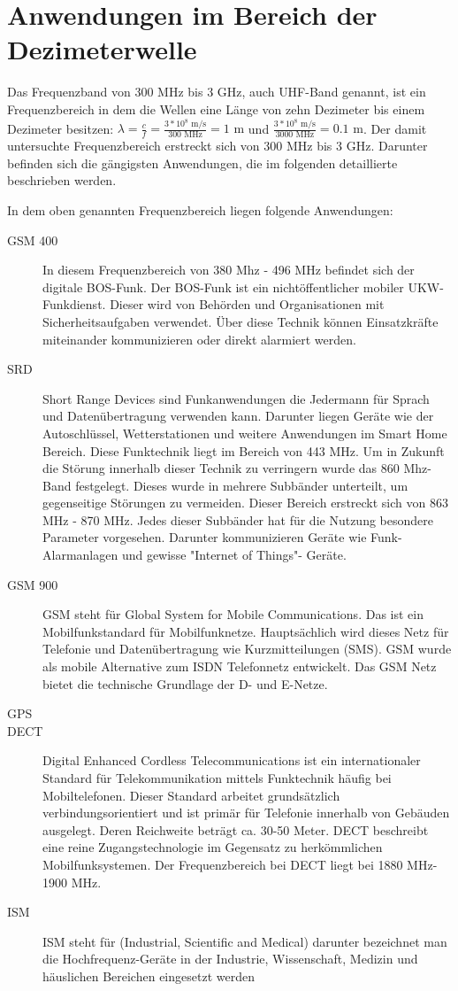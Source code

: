 \section{Anwendungen im Bereich der Dezimeterwelle}
Das Frequenzband von 300 MHz bis 3 GHz, auch \ac{UHF}-Band genannt, ist ein Frequenzbereich in dem die Wellen eine Länge von zehn Dezimeter bis einem Dezimeter besitzen:
\( \lambda = \frac{c}{f} = \frac{3*10^8 \text{ m/s}}{300 \text{ MHz}} = 1\text{ m}\)
und
\( \frac{3*10^8 \text{ m/s}}{3000 \text{ MHz}} = 0.1\text{ m}\).
Der damit untersuchte Frequenzbereich erstreckt sich von 300 MHz bis 3 GHz. Darunter befinden sich die gängigsten Anwendungen, die im folgenden detaillierte beschrieben werden.

In dem oben genannten Frequenzbereich liegen folgende Anwendungen:

\begin{description}
	\item [GSM 400]{In diesem Frequenzbereich von 380 Mhz - 496 MHz befindet sich der digitale BOS-Funk. Der BOS-Funk ist ein nichtöffentlicher mobiler UKW-Funkdienst. Dieser wird von Behörden und Organisationen mit Sicherheitsaufgaben verwendet. Über diese Technik können Einsatzkräfte miteinander kommunizieren oder direkt alarmiert werden.}
	\item [SRD] {Short Range Devices sind Funkanwendungen die Jedermann für Sprach und Datenübertragung verwenden kann. Darunter liegen Geräte wie der Autoschlüssel, Wetterstationen und weitere Anwendungen im Smart Home Bereich. Diese Funktechnik liegt im Bereich von 443 MHz. Um in Zukunft die Störung innerhalb dieser Technik zu verringern  wurde das 860 Mhz-Band festgelegt. Dieses wurde in mehrere Subbänder unterteilt, um gegenseitige Störungen zu vermeiden. Dieser Bereich erstreckt sich von 863 MHz - 870 MHz. Jedes dieser Subbänder hat für die Nutzung besondere Parameter vorgesehen. Darunter kommunizieren Geräte wie Funk-Alarmanlagen und gewisse "Internet of Things"- Geräte.}
	\item [GSM 900] {GSM steht für Global System for Mobile Communications. Das ist ein Mobilfunkstandard für Mobilfunknetze. Hauptsächlich wird dieses Netz für Telefonie und Datenübertragung wie Kurzmitteilungen (SMS). GSM wurde als mobile Alternative zum ISDN Telefonnetz entwickelt. Das GSM Netz bietet die technische Grundlage der D- und E-Netze.  }
	\item [GPS] {}%
	\item [DECT] {Digital Enhanced Cordless Telecommunications ist ein internationaler Standard für Telekommunikation mittels Funktechnik häufig bei Mobiltelefonen. Dieser Standard arbeitet grundsätzlich verbindungsorientiert und ist primär für Telefonie innerhalb von Gebäuden ausgelegt. Deren Reichweite beträgt ca. 30-50 Meter. DECT beschreibt eine reine Zugangstechnologie im Gegensatz zu herkömmlichen Mobilfunksystemen. Der Frequenzbereich bei DECT liegt bei 1880 MHz-1900 MHz.}
	\item [ISM] {ISM steht für (Industrial, Scientific and Medical) darunter bezeichnet man die Hochfrequenz-Geräte in der Industrie, Wissenschaft, Medizin und häuslichen Bereichen eingesetzt werden}
\end{description}

